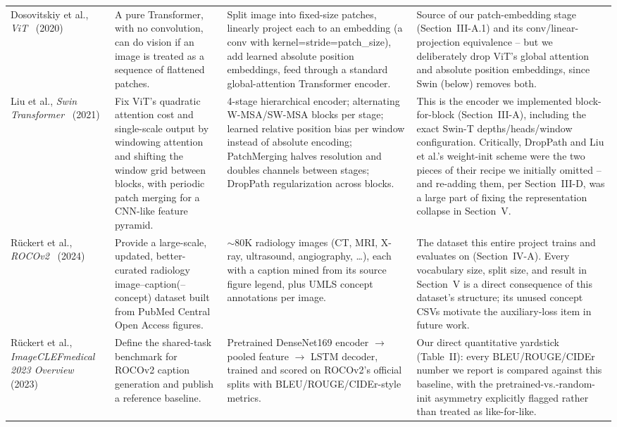 \documentclass[conference]{IEEEtran}
\begin{document}
\begin{table}[t]
\begin{tabularx}{\textwidth}{@{}p{2.3cm}X X X@{}}
Dosovitskiy et al., \emph{ViT}~\cite{dosovitskiy2020vit} (2020)
&
A pure Transformer, with no convolution, can do vision if an image is treated as a sequence of flattened patches.
&
Split image into fixed-size patches, linearly project each to an embedding (a conv with kernel=stride=patch\_size), add learned absolute position embeddings, feed through a standard global-attention Transformer encoder.
&
Source of our patch-embedding stage (Section~III-A.1) and its conv/linear-projection equivalence -- but we deliberately drop ViT's global attention and absolute position embeddings, since Swin (below) removes both. \\

Liu et al., \emph{Swin Transformer}~\cite{liu2021swin} (2021)
&
Fix ViT's quadratic attention cost and single-scale output by windowing attention and shifting the window grid between blocks, with periodic patch merging for a CNN-like feature pyramid.
&
4-stage hierarchical encoder; alternating W-MSA/SW-MSA blocks per stage; learned relative position bias per window instead of absolute encoding; PatchMerging halves resolution and doubles channels between stages; DropPath regularization across blocks.
&
This is the encoder we implemented block-for-block (Section~III-A), including the exact Swin-T depths/heads/window configuration. Critically, DropPath and Liu et al.'s weight-init scheme were the two pieces of their recipe we initially omitted -- and re-adding them, per Section~III-D, was a large part of fixing the representation collapse in Section~V. \\

Rückert et al., \emph{ROCOv2}~\cite{ruckert2024rocov2} (2024)
&
Provide a large-scale, updated, better-curated radiology image--caption(--concept) dataset built from PubMed Central Open Access figures.
&
$\sim$80K radiology images (CT, MRI, X-ray, ultrasound, angiography, \ldots), each with a caption mined from its source figure legend, plus UMLS concept annotations per image.
&
The dataset this entire project trains and evaluates on (Section~IV-A). Every vocabulary size, split size, and result in Section~V is a direct consequence of this dataset's structure; its unused concept CSVs motivate the auxiliary-loss item in future work. \\

Rückert et al., \emph{ImageCLEFmedical 2023 Overview}~\cite{ruckert2023imageclef} (2023)
&
Define the shared-task benchmark for ROCOv2 caption generation and publish a reference baseline.
&
Pretrained DenseNet169 encoder $\to$ pooled feature $\to$ LSTM decoder, trained and scored on ROCOv2's official splits with BLEU/ROUGE/CIDEr-style metrics.
&
Our direct quantitative yardstick (Table~II): every BLEU/ROUGE/CIDEr number we report is compared against this baseline, with the pretrained-vs.-random-init asymmetry explicitly flagged rather than treated as like-for-like. \\


\end{tabularx}
\end{table}
\end{document}
